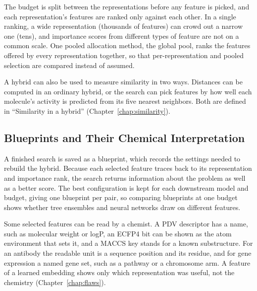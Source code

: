 The budget is split between the representations before any feature is picked, and each representation's features are ranked only against each other. In a single ranking, a wide representation (thousands of features) can crowd out a narrow one (tens), and importance scores from different types of feature are not on a common scale. One pooled allocation method, the global pool, ranks the features offered by every representation together, so that per-representation and pooled selection are compared instead of assumed.

A hybrid can also be used to measure similarity in two ways. Distances can be computed in an ordinary hybrid, or the search can pick features by how well each molecule's activity is predicted from its five nearest neighbors. Both are defined in ``Similarity in a hybrid'' (Chapter~\ref{chap:similarity}).


\subsection{Blueprints and Their Chemical Interpretation}

A finished search is saved as a blueprint, which records the settings needed to rebuild the hybrid. Because each selected feature traces back to its representation and importance rank, the search returns information about the problem as well as a better score. The best configuration is kept for each downstream model and budget, giving one blueprint per pair, so comparing blueprints at one budget shows whether tree ensembles and neural networks draw on different features.

Some selected features can be read by a chemist. A PDV descriptor has a name, such as molecular weight or logP, an ECFP4 bit can be shown as the atom environment that sets it, and a MACCS key stands for a known substructure. For an antibody the readable unit is a sequence position and its residue, and for gene expression a named gene set, such as a pathway or a chromosome arm. A feature of a learned embedding shows only which representation was useful, not the chemistry (Chapter~\ref{chap:flaws}).

